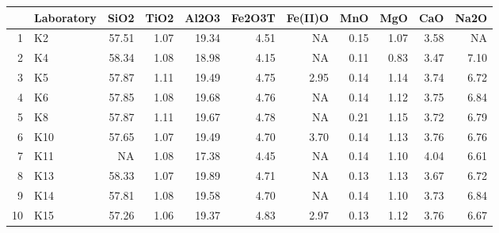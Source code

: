 \begin{table}[ht]
\centering
\begin{tabular}{rlrrrrrrrrr}
  \hline
 & Laboratory & SiO2 & TiO2 & Al2O3 & Fe2O3T & Fe(II)O & MnO & MgO & CaO & Na2O \\ 
  \hline
1 & K2 & 57.51 & 1.07 & 19.34 & 4.51 & NA & 0.15 & 1.07 & 3.58 & NA \\ 
  2 & K4 & 58.34 & 1.08 & 18.98 & 4.15 & NA & 0.11 & 0.83 & 3.47 & 7.10 \\ 
  3 & K5 & 57.87 & 1.11 & 19.49 & 4.75 & 2.95 & 0.14 & 1.14 & 3.74 & 6.72 \\ 
  4 & K6 & 57.85 & 1.08 & 19.68 & 4.76 & NA & 0.14 & 1.12 & 3.75 & 6.84 \\ 
  5 & K8 & 57.87 & 1.11 & 19.67 & 4.78 & NA & 0.21 & 1.15 & 3.72 & 6.79 \\ 
  6 & K10 & 57.65 & 1.07 & 19.49 & 4.70 & 3.70 & 0.14 & 1.13 & 3.76 & 6.76 \\ 
  7 & K11 & NA & 1.08 & 17.38 & 4.45 & NA & 0.14 & 1.10 & 4.04 & 6.61 \\ 
  8 & K13 & 58.33 & 1.07 & 19.89 & 4.71 & NA & 0.13 & 1.13 & 3.67 & 6.72 \\ 
  9 & K14 & 57.81 & 1.08 & 19.58 & 4.70 & NA & 0.14 & 1.10 & 3.73 & 6.84 \\ 
  10 & K15 & 57.26 & 1.06 & 19.37 & 4.83 & 2.97 & 0.13 & 1.12 & 3.76 & 6.67 \\ 
   \hline
\end{tabular}
\end{table}
